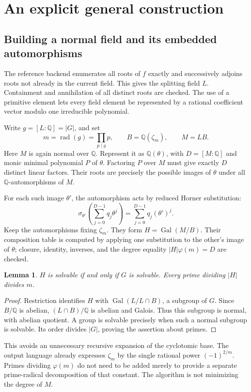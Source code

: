 \documentclass[11pt,letterpaper]{article}
\newtheorem{lemma}[theorem]{Lemma}
\theoremstyle{definition}\newtheorem{definition}[theorem]{Definition}
\theoremstyle{remark}\newtheorem{remark}[theorem]{Remark}
\newcommand{\Q}{\mathbb Q}\newcommand{\C}{\mathbb C}\newcommand{\Z}{\mathbb Z}
\newcommand{\Gal}{\operatorname{Gal}}\newcommand{\Fix}{\operatorname{Fix}}
\newcommand{\rad}{\operatorname{rad}}\newcommand{\code}[1]{\texttt{\detokenize{#1}}}
\begin{document}
\section{An explicit general construction}
\label{sec:construction}
\subsection{Building a normal field and its embedded automorphisms}
The reference backend enumerates all roots of \(f\) exactly and successively
adjoins roots not already in the current field. This gives the splitting
field \(L\). Containment and annihilation of all distinct roots are checked.
The use of a primitive element lets every field element be represented by a
rational coefficient vector modulo one irreducible polynomial.

Write \(g=[L:\Q]=|G|\), and set
\begin{equation}
 m=\rad(g)=\prod_{p\mid g}p,\qquad
 B=\Q(\zeta_m),\qquad M=LB.\label{eq:cyclobase}
\end{equation}
Here \(M\) is again normal over \(\Q\). Represent it as
\(\Q(\theta)\), with \(D=[M:\Q]\) and monic minimal polynomial \(P\) of
\(\theta\). Factoring \(P\) over \(M\) must give exactly \(D\) distinct
linear factors. Their roots are precisely the possible images of \(\theta\)
under all \(\Q\)-automorphisms of \(M\).

For each such image \(\theta'\), the automorphism acts by reduced Horner
substitution:
\[
 \sigma_{\theta'}\left(\sum_{j=0}^{D-1}q_j\theta^j\right)
       =\sum_{j=0}^{D-1}q_j(\theta')^j.
\]
Keep the automorphisms fixing \(\zeta_m\). They form
\(H=\Gal(M/B)\). Their composition table is computed by applying one
substitution to the other's image of \(\theta\); closure, identity, inverses,
and the degree equality \(|H|\varphi(m)=D\) are checked.

\begin{lemma}
\(H\) is solvable if and only if \(G\) is solvable. Every prime dividing
\(|H|\) divides \(m\).
\end{lemma}
\begin{proof}
Restriction identifies \(H\) with \(\Gal(L/L\cap B)\), a subgroup of
\(G\). Since \(B/\Q\) is abelian, \((L\cap B)/\Q\) is abelian and
Galois. Thus this subgroup is normal, with abelian quotient. A group is
solvable precisely when such a normal subgroup is solvable. Its order divides
\(|G|\), proving the assertion about primes.
\end{proof}
This avoids an unnecessary recursive expansion of the cyclotomic base.
The output language already expresses \(\zeta_m\) by the single rational
power \((-1)^{2/m}\). Primes dividing \(\varphi(m)\) do not need to be
added merely to provide a separate prime-radical decomposition of that
constant. The algorithm is not minimizing the degree of \(M\).
\end{document}
